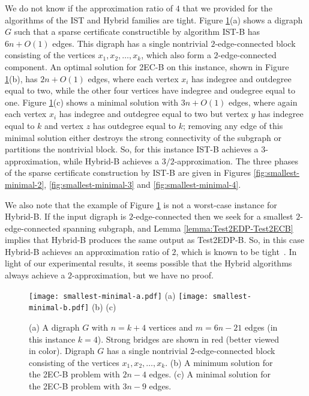 \documentclass[11pt]{article}
\begin{document}
We do not know if the approximation ratio of $4$ that we provided for the algorithms of the \textsf{IST} and \textsf{Hybrid} families are tight. Figure \ref{fig:smallest-minimal}(a) shows a digraph $G$ such that a sparse certificate constructible by algorithm \textsf{IST-B} has $6n+O(1)$ edges. This digraph has a single nontrivial $2$-edge-connected block consisting of the vertices $x_1, x_2, \ldots, x_k$, which also form a $2$-edge-connected component.
An optimal solution for \textsf{2EC-B} on this instance, shown in Figure \ref{fig:smallest-minimal}(b), has $2n+O(1)$ edges, where each vertex $x_i$ has indegree and outdegree equal to two, while the other four vertices have indegree and oudegree equal to one. Figure \ref{fig:smallest-minimal}(c) shows a minimal solution with $3n+O(1)$ edges, where again each vertex $x_i$ has indegree and outdegree equal to two but vertex $y$ has indegree equal to $k$ and vertex $z$ has outdegree equal to $k$; removing any edge of this minimal solution either destroys the strong connectivity of the subgraph or partitions the nontrivial block.  So, for this instance \textsf{IST-B} achieves a $3$-approximation, while \textsf{Hybrid-B} achieves a $3/2$-approximation.
The three phases of the sparse certificate construction by \textsf{IST-B} are given in Figures \ref{fig:smallest-minimal-2}, \ref{fig:smallest-minimal-3} and \ref{fig:smallest-minimal-4}.

We also note that the example of Figure \ref{fig:smallest-minimal} is not a worst-case instance for \textsf{Hybrid-B}. If the input digraph is $2$-edge-connected then we seek for a smallest $2$-edge-connected spanning subgraph, and Lemma \ref{lemma:Test2EDP-Test2ECB} implies that \textsf{Hybrid-B} produces the same output as \textsf{Test2EDP-B}. So, in this case \textsf{Hybrid-B} achieves an approximation ratio of $2$, which is known to be tight~\cite{CT00}. 
In light of our experimental results, it seems possible that the \textsf{Hybrid} algorithms always achieve a $2$-approximation, but we have no proof.

\begin{figure}[t!]
\begin{center}
\texttt{[image: smallest-minimal-a.pdf]}
(a)
\texttt{[image: smallest-minimal-b.pdf]}
(b) \hspace{7.5cm} (c) \hspace{2.5cm}
\end{center}
\caption{(a) A digraph $G$ with $n=k+4$ vertices and $m = 6n - 21$ edges (in this instance $k=4$). Strong bridges are shown in red (better viewed in color). Digraph $G$ has a single nontrivial  $2$-edge-connected block consisting of the vertices $x_1, x_2, \ldots, x_k$. (b) A minimum solution for the \textsf{2EC-B} problem with $2n-4$ edges. (c) A minimal solution for the \textsf{2EC-B} problem with $3n-9$ edges.}
\label{fig:smallest-minimal}
\end{figure}
\end{document}
